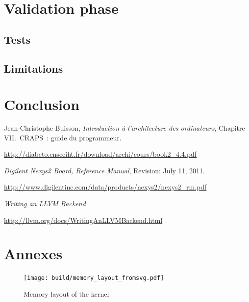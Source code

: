 \documentclass[openany, a4paper]{book}
\begin{document}
  \chapter{Validation phase}

    \section{Tests}

    \section{Limitations}

  \chapter{Conclusion}

  \setcounter{chapter}{0}
  \renewcommand{\thechapter}{\Alph{chapter}}

  \patchcmd{\thebibliography}{\chapter*}{\chapter}{}{}
  \begin{thebibliography}{9}
      Jean-Christophe Buisson,
      \emph{Introduction à l'architecture des ordinateurs},
      Chapitre VII.\ CRAPS~: guide du programmeur.

      \mbox{\url{http://diabeto.enseeiht.fr/download/archi/cours/book2_4.4.pdf}}

      \emph{Digilent Nexys2 Board, Reference Manual},
      Revision: July 11, 2011.

      \mbox{\url{http://www.digilentinc.com/data/products/nexys2/nexys2_rm.pdf}}

      \emph{Writing an LLVM Backend}

      \mbox{\url{http://llvm.org/docs/WritingAnLLVMBackend.html}}
  \end{thebibliography}

  \chapter{Annexes}
    \begin{figure}
      \centering
      \texttt{[image: build/memory\_layout\_fromsvg.pdf]}
      \caption{Memory layout of the kernel}\label{fig:memory}
    \end{figure}
\end{document}
